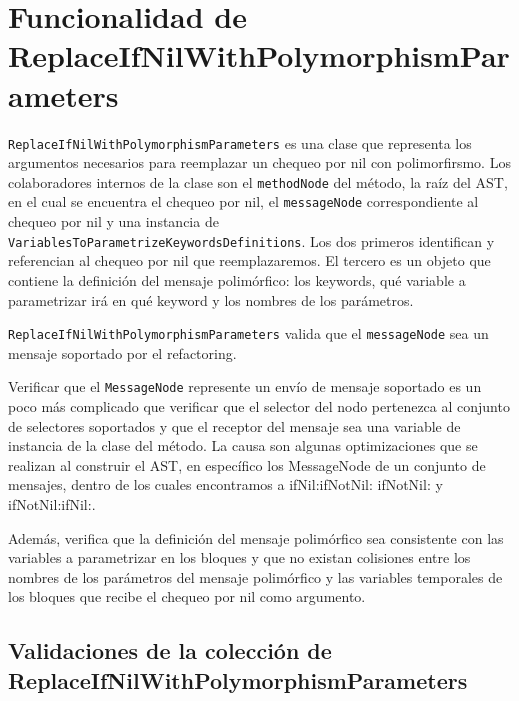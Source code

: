 
\section{Funcionalidad de ReplaceIfNilWithPolymorphismParameters}

\lstinline{ReplaceIfNilWithPolymorphismParameters} es una clase que representa los argumentos necesarios
para reemplazar un chequeo por nil con polimorfirsmo. Los colaboradores internos de la clase son el
\lstinline{methodNode} del método, la raíz del AST, en el cual se encuentra el chequeo por nil,
el \lstinline{messageNode} correspondiente al chequeo por nil y una instancia de
\lstinline{VariablesToParametrizeKeywordsDefinitions}. Los dos primeros identifican y referencian al
chequeo por nil que reemplazaremos. El tercero es un objeto que contiene la definición del 
mensaje polimórfico: los keywords, qué variable a parametrizar irá en qué keyword y los nombres de
los parámetros.

\lstinline{ReplaceIfNilWithPolymorphismParameters} valida que el \lstinline{messageNode} sea un mensaje
soportado por el refactoring.

Verificar que el \lstinline{MessageNode} represente un envío de mensaje soportado es un poco más 
complicado que verificar que el selector del nodo pertenezca al conjunto de selectores soportados
y que el receptor del mensaje sea una variable de instancia de la clase del método. La causa son algunas
optimizaciones que se realizan al construir el AST, en específico los MessageNode de un conjunto de mensajes,
dentro de los cuales encontramos a ifNil:ifNotNil: ifNotNil: y ifNotNil:ifNil:.


Además, verifica que la definición del mensaje polimórfico sea consistente con
las variables a parametrizar en los bloques y que no existan colisiones entre
los nombres de los parámetros del mensaje polimórfico y las variables temporales
de los bloques que recibe el chequeo por nil como argumento.


\subsection{Validaciones de la colección de ReplaceIfNilWithPolymorphismParameters}

